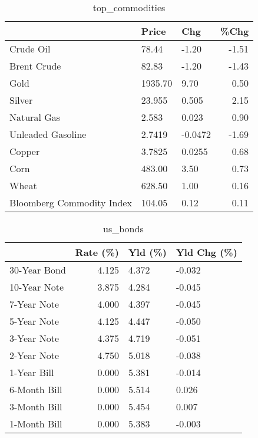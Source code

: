 \documentclass{article}%
\begin{document}
\begin{table}[htbp]%
\caption{top\_commodities}%
\centering%
\begin{adjustbox}{width=1\textwidth}%
\begin{tabular}{lllr}
\toprule
                          &   Price &     Chg &  \%Chg \\
\midrule
               Crude Oil  &   78.44 &   -1.20 & -1.51 \\
             Brent Crude  &   82.83 &   -1.20 & -1.43 \\
                    Gold  & 1935.70 &    9.70 &  0.50 \\
                  Silver  &  23.955 &   0.505 &  2.15 \\
             Natural Gas  &   2.583 &   0.023 &  0.90 \\
       Unleaded Gasoline  &  2.7419 & -0.0472 & -1.69 \\
                  Copper  &  3.7825 &  0.0255 &  0.68 \\
                    Corn  &  483.00 &    3.50 &  0.73 \\
                   Wheat  &  628.50 &    1.00 &  0.16 \\
Bloomberg Commodity Index &  104.05 &    0.12 &  0.11 \\
\bottomrule
\end{tabular}
%
\end{adjustbox}%
\end{table}

%


\begin{table}[htbp]%
\caption{us\_bonds}%
\centering%
\begin{adjustbox}{width=1\textwidth}%
\begin{tabular}{lrll}
\toprule
             &  Rate (\%) & Yld (\%) & Yld Chg (\%) \\
\midrule
30-Year Bond &     4.125 &   4.372 &      -0.032 \\
10-Year Note &     3.875 &   4.284 &      -0.045 \\
 7-Year Note &     4.000 &   4.397 &      -0.045 \\
 5-Year Note &     4.125 &   4.447 &      -0.050 \\
 3-Year Note &     4.375 &   4.719 &      -0.051 \\
 2-Year Note &     4.750 &   5.018 &      -0.038 \\
 1-Year Bill &     0.000 &   5.381 &      -0.014 \\
6-Month Bill &     0.000 &   5.514 &       0.026 \\
3-Month Bill &     0.000 &   5.454 &       0.007 \\
1-Month Bill &     0.000 &   5.383 &      -0.003 \\
\bottomrule
\end{tabular}
%
\end{adjustbox}%
\end{table}
\end{document}
